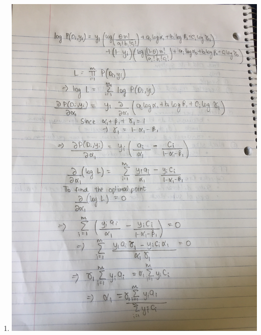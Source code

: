 \documentclass[11pt]{article}
\newcommand{\solution}[1]{{{\color{blue}{\bf Solution:} {#1}}}}
\begin{document}
\begin{enumerate}
\item \solution{} \newline
\includegraphics[scale=0.1]{1c_1.JPG} \newline

\end{enumerate}
\end{document}
